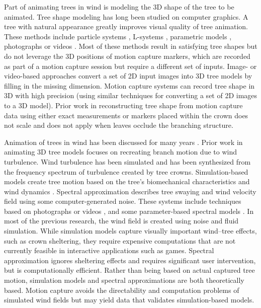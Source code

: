 Part of animating trees in wind is modeling the 3D shape of the tree to be animated. Tree shape modeling has long been studied on computer graphics. A tree with natural appearance greatly improves visual quality of tree animation. These methods include particle systems \cite{Reeves83particlesystems,Runions07,palubicki:siggraph09,neubert:acmtg07}, L-systems \cite{lindenmayer68,Lintermann1999,Prusinkiewicz:2001}, parametric models \cite{Weber1995}, photographs \cite{RecheMartinez2004,neubert:acmtg07,Tan:2007:ITM} or videos \cite{Li:2011:MGM,Diener:2006}. Most of these methods result in satisfying tree shapes but do not leverage the 3D positions of motion capture markers, which are recorded as part of a motion capture session but require a different set of inputs. Image- or video-based approaches convert a set of 2D input images into 3D tree models by filling in the missing dimension.  Motion capture systems can record tree shape in 3D with high precision (using similar techniques for converting a set of 2D images to a 3D model). Prior work \cite{Long:MCN2010} in reconstructing tree shape from motion capture data using either exact measurements or markers placed within the crown does not scale and does not apply when leaves occlude the branching structure.

Animation of trees in wind has been discussed for many years \cite{Akagi:cg06,stams:eu97,shinya:eu92}. Prior work in animating 3D tree models focuses on recreating branch motion due to wind turbulence. Wind turbulence has been simulated and has been synthesized from the frequency spectrum of turbulence created by tree crowns. Simulation-based models create tree motion based on the tree's biomechanical characteristics and wind dynamics \cite{Akagi:cg06,Habel09PGT}. Spectral approximation describes tree swaying and wind velocity field using some computer-generated noise. These systems include techniques based on photographs \cite{wu:cas99} or videos \cite{Diener:2006}, and some parameter-based spectral models \cite{Habel09PGT,shinya:eu92}. In most of the previous research, the wind field is created using noise and fluid simulation. While simulation models capture visually important wind--tree effects, such as crown sheltering, they require expensive computations that are not currently feasible in interactive applications such as games. Spectral approximation ignores sheltering effects and requires significant user intervention, but is computationally efficient. Rather than being based on actual captured tree motion, simulation models and spectral approximations are both theoretically based. Motion capture avoids the directability and computation problems of simulated wind fields but may yield data that validates simulation-based models. 

